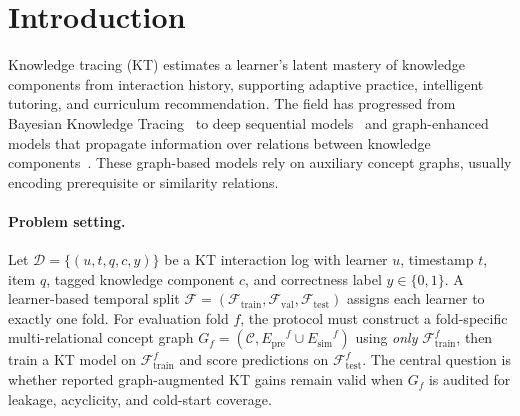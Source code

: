 \documentclass[pdflatex,sn-basic]{sn-jnl}
\newcommand{\Epre}{\ensuremath{E_{\text{pre}}}}
\newcommand{\Esim}{\ensuremath{E_{\text{sim}}}}
\newcommand{\KC}{knowledge component}
\newcommand{\KCs}{knowledge components}
\begin{document}

\maketitle

\section{Introduction}
\label{sec:intro}
Knowledge tracing (KT) estimates a learner's latent mastery of
\KCs{} from interaction history, supporting adaptive practice,
intelligent tutoring, and curriculum recommendation. The field has
progressed from Bayesian Knowledge Tracing~\cite{corbett1995bkt} to
deep sequential models~\cite{piech2015dkt,zhang2017dkvmn,ghosh2020akt,liu2023simplekt,pandey2019rkt,shen2021saint} and graph-enhanced models
that propagate information over relations between
\KCs{}~\cite{nakagawa2019gkt,tong2020skt,yang2021gikt,dygkt2024,dgekt2024,chen2023hgkt}. These graph-based models rely on
auxiliary concept graphs, usually encoding prerequisite or similarity
relations.

\paragraph{Problem setting.}
Let $\mathcal{D}=\{(u,t,q,c,y)\}$ be a KT interaction log with learner
$u$, timestamp $t$, item $q$, tagged \KC{} $c$, and correctness label
$y\in\{0,1\}$. A learner-based temporal split
$\mathcal{F}=(\mathcal{F}_{\text{train}},\mathcal{F}_{\text{val}},
\mathcal{F}_{\text{test}})$ assigns each learner to exactly one fold.
For evaluation fold $f$, the protocol must construct a fold-specific
multi-relational concept graph
$G_f=(\mathcal{C},\Epre^f\cup\Esim^f)$ using \emph{only}
$\mathcal{F}_{\text{train}}^f$, then train a KT model on
$\mathcal{F}_{\text{train}}^f$ and score predictions on
$\mathcal{F}_{\text{test}}^f$. The central question is whether reported
graph-augmented KT gains remain valid when $G_f$ is audited for
leakage, acyclicity, and cold-start coverage.
\end{document}
